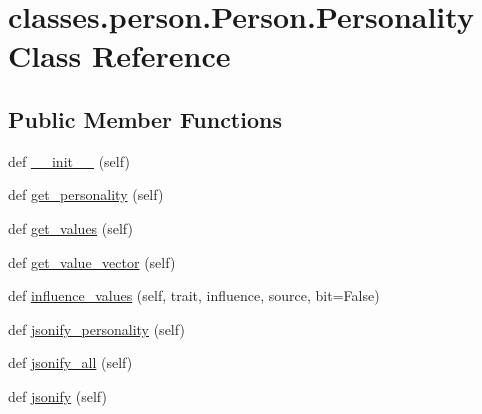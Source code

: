 \hypertarget{classclasses_1_1person_1_1Person_1_1Personality}{}\section{classes.\+person.\+Person.\+Personality Class Reference}
\label{classclasses_1_1person_1_1Person_1_1Personality}
\subsection*{Public Member Functions}
\begin{DoxyCompactItemize}
\item 
def \hyperlink{classclasses_1_1person_1_1Person_1_1Personality_a034c4404a486c2ae4f13b069c01851a6}{\+\_\+\+\_\+init\+\_\+\+\_\+} (self)
\item 
def \hyperlink{classclasses_1_1person_1_1Person_1_1Personality_a7e1f27f8d70d00f563fe406f26e73e53}{get\+\_\+personality} (self)
\item 
def \hyperlink{classclasses_1_1person_1_1Person_1_1Personality_af132c1cfaf8922b337e0c66843341a7b}{get\+\_\+values} (self)
\item 
def \hyperlink{classclasses_1_1person_1_1Person_1_1Personality_a476743a43bf0b3cb21a9680c61531436}{get\+\_\+value\+\_\+vector} (self)
\item 
def \hyperlink{classclasses_1_1person_1_1Person_1_1Personality_a5b32b713ecf8410f9c42ed7bd5525de0}{influence\+\_\+values} (self, trait, influence, source, bit=False)
\item 
def \hyperlink{classclasses_1_1person_1_1Person_1_1Personality_a8ac7a056827be621af0683e93054c25b}{jsonify\+\_\+personality} (self)
\item 
def \hyperlink{classclasses_1_1person_1_1Person_1_1Personality_a969cdb9e23dd9d5c4cc70f8179cd557e}{jsonify\+\_\+all} (self)
\item 
def \hyperlink{classclasses_1_1person_1_1Person_1_1Personality_a229710d0c361f8aa849864856eba38e3}{jsonify} (self)
\end{DoxyCompactItemize}
